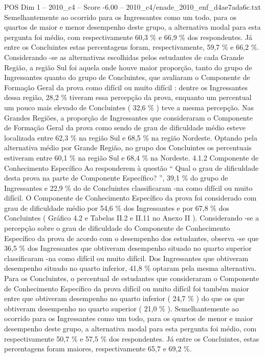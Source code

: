 \begin{textsample}{POS Dim 1 – 2010\_c4 – Score -6.00 – 2010\_c4/enade\_2010\_enf\_d4ae7ada6c.txt}
Semelhantemente ao ocorrido para os Ingressantes como um todo, para os quartos de maior e menor desempenho deste grupo, a alternativa modal para esta pergunta foi médio, com respectivamente 60,3 \% e 66,9 \% dos respondentes.
Já entre os Concluintes estas percentagens foram, respectivamente, 59,7 \% e 66,2 \%.
Considerando -se as alternativas escolhidas pelos estudantes de cada Grande Região, a região Sul foi aquela onde houve maior proporção, tanto do grupo de Ingressantes quanto do grupo de Concluintes, que avaliaram o Componente de Formação Geral da prova como difícil ou muito difícil : dentre os Ingressantes dessa região, 28,2 \% tiveram essa percepção da prova, enquanto um percentual um pouco mais elevado de Concluintes ( 32,6 \% ) teve a mesma percepção.
Nas Grandes Regiões, a proporção de Ingressantes que consideraram o Componente de Formação Geral da prova como sendo de grau de dificuldade médio esteve localizada entre 62,3 \% na região Sul e 68,5 \% na região Nordeste.
Optando pela alternativa médio por Grande Região, no grupo dos Concluintes os percentuais estiveram entre 60,1 \% na região Sul e 68,4 \% na Nordeste. 4.1.2 Componente de Conhecimento Específico Ao responderem à questão “ Qual o grau de dificuldade desta prova na parte de Componente Específico? ”, 39,1 \% do grupo de Ingressantes e 22,9 \% do de Concluintes classificaram -na como difícil ou muito difícil.
O Componente de Conhecimento Específico da prova foi considerado com grau de dificuldade médio por 54,6 \% dos Ingressantes e por 67,8 \% dos Concluintes ( Gráfico 4.2 e Tabelas II.2 e II.11 no Anexo II ).
Considerando -se a percepção sobre o grau de dificuldade do Componente de Conhecimento Específico da prova de acordo com o desempenho dos estudantes, observa -se que 36,5 \% dos Ingressantes que obtiveram desempenho situado no quarto superior classificaram -na como difícil ou muito difícil.
Dos Ingressantes que obtiveram desempenho situado no quarto inferior, 41,8 \% optaram pela mesma alternativa.
Para os Concluintes, o percentual de estudantes que consideraram o Componente de Conhecimento Específico da prova difícil ou muito difícil foi também maior entre que obtiveram desempenho no quarto inferior ( 24,7 \% ) do que os que obtiveram desempenho no quarto superior ( 21,0 \% ).
Semelhantemente ao ocorrido para os Ingressantes como um todo, para os quartos de menor e maior desempenho deste grupo, a alternativa modal para esta pergunta foi médio, com respectivamente 50,7 \% e 57,5 \% dos respondentes.
Já entre os Concluintes, estas percentagens foram maiores, respectivamente 65,7 e 69,2 \%.

\end{textsample}
